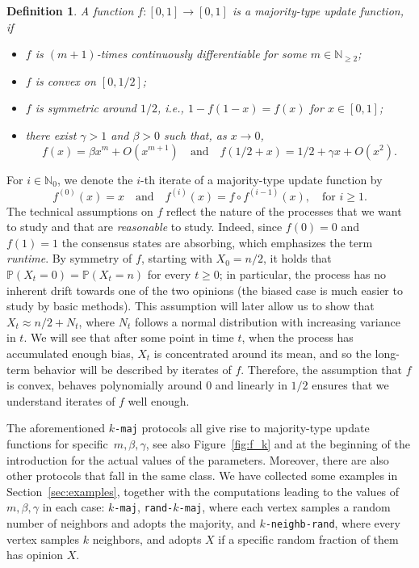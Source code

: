 \documentclass[11pt]{article}
\newcommand{\Prob}{\mathbb{P}}
\numberwithin{theorem}{section}
\newtheorem{definition}[theorem]{Definition}
\begin{document}
\begin{definition}\label{def: majority-type}
A function $f:[0,1] \rightarrow [0,1]$ is a \emph{majority-type update function}, if
{
\begin{itemize}
\itemsep-1pt
    \item $f$ is $(m+1)$-times continuously differentiable for some $m\in \mathbb{N}_{\geq 2}$; 
    \item $f$ is convex on $[0,1/2]$;
    \item $f$ is symmetric around $1/2$, i.e., $1-f(1-x)=f(x)$ for $x\in[0,1]$;
    \item there exist $\gamma >1$ and $\beta >0$ such that, as $x \to 0$,
    \[
    f(x) = \beta x^m +O(x^{m+1})\quad \text{and}\quad f(1/2 +x) = 1/2 +\gamma  x+O(x^2).
    \]
\end{itemize} 
}
\end{definition}
For $i\in \mathbb{N}_0$, we denote the $i$-th iterate of a majority-type update function by
\[
f^{(0)}(x)=x
\quad 
\text{and}
\quad
f^{(i)}(x)=f\circ f^{(i-1)}(x), \quad  \text{for }i\geq 1.
\]
The technical assumptions on $f$ reflect the nature of the processes that we want to study and that are \emph{reasonable} to study. Indeed, since $f(0)=0$ and $f(1)=1$ the consensus states are absorbing, which emphasizes the term \emph{runtime}. By symmetry of $f$, starting with $X_0=n/2$, it holds that $\Prob(X_t =0)=\Prob(X_t=n)$ for every $t\geq0$; in particular, the process has no inherent drift towards one of the two opinions (the biased case is much easier to study by basic methods). This assumption will later allow us to show that $X_t \approx n/2 + N_t$, where $N_t$ follows a normal distribution with increasing variance in $t$. We will see that after some point in time $t$, when the process has accumulated enough bias, $X_t$ is concentrated around its mean, and so the long-term behavior will be described by iterates of $f$. 
Therefore, the assumption that $f$ is convex, behaves polynomially around $0$ and linearly in $1/2$ ensures that we understand iterates of $f$ well enough. 

The aforementioned \texttt{$k$-maj} protocols all give rise to majority-type update functions for specific~$m,\beta,\gamma$, see also Figure~\ref{fig:f_k} and at the beginning of the introduction for the actual values of the parameters. Moreover, there are also other protocols that fall in the same class. We have collected some examples in Section~\ref{sec:examples}, together with the computations leading to the values of $m,\beta,\gamma$ in each case:
\texttt{$k$-maj}, \texttt{rand-$k$-maj}, where each vertex samples a random number of neighbors and adopts the majority, and \texttt{$k$-neighb-rand}, where every vertex samples $k$ neighbors, and adopts $X$ if a specific random fraction of them has opinion $X$.
\end{document}
